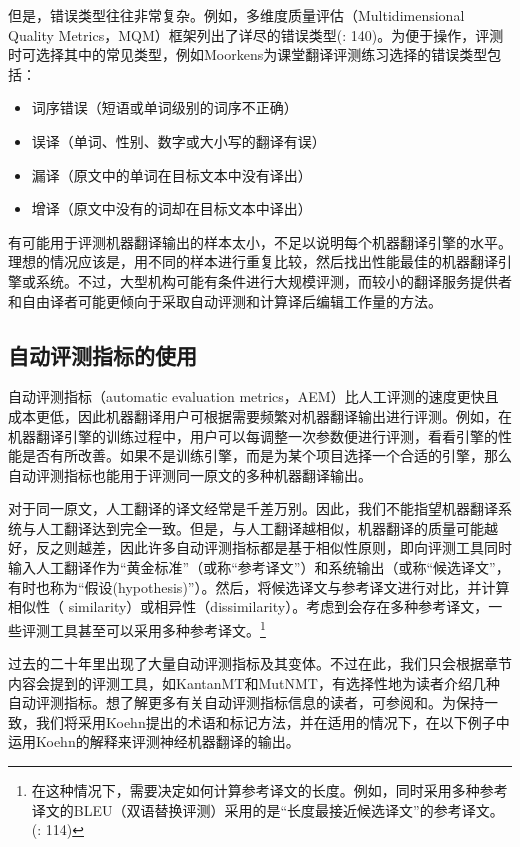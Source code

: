 \documentclass[output=paper]{langscibook}
\begin{document}
但是，错误类型往往非常复杂。例如，多维度质量评估（Multidimensional Quality Metrics，MQM）框架列出了详尽的错误类型(\citealt{MarianaMelby2015}: 140)。为便于操作，评测时可选择其中的常见类型，例如Moorkens为课堂翻译评测练习选择的错误类型\citep[380]{Moorkens2018}包括：

\begin{itemize}
\item 词序错误（短语或单词级别的词序不正确）
\item 误译（单词、性别、数字或大小写的翻译有误）
\item 漏译（原文中的单词在目标文本中没有译出）
\item 增译（原文中没有的词却在目标文本中译出）
\end{itemize}

有可能用于评测机器翻译输出的样本太小，不足以说明每个机器翻译引擎的水平。理想的情况应该是，用不同的样本进行重复比较，然后找出性能最佳的机器翻译引擎或系统。不过，大型机构可能有条件进行大规模评测，而较小的翻译服务提供者和自由译者可能更倾向于采取自动评测和计算译后编辑工作量的方法。


\subsection{自动评测指标的使用}

自动评测指标（automatic evaluation metrics，AEM）比人工评测的速度更快且成本更低，因此机器翻译用户可根据需要频繁对机器翻译输出进行评测。例如，在机器翻译引擎的训练过程中，用户可以每调整一次参数便进行评测，看看引擎的性能是否有所改善。如果不是训练引擎，而是为某个项目选择一个合适的引擎，那么自动评测指标也能用于评测同一原文的多种机器翻译输出。

对于同一原文，人工翻译的译文经常是千差万别。因此，我们不能指望机器翻译系统与人工翻译达到完全一致。但是，与人工翻译越相似，机器翻译的质量可能越好，反之则越差，因此许多自动评测指标都是基于相似性原则，即向评测工具同时输入人工翻译作为“黄金标准”（或称“参考译文”）和系统输出（或称“候选译文”，有时也称为“假设(hypothesis)”）。然后，将候选译文与参考译文进行对比，并计算相似性（ similarity）或相异性（dissimilarity）。考虑到会存在多种参考译文，一些评测工具甚至可以采用多种参考译文。\footnote{在这种情况下，需要决定如何计算参考译文的长度。例如，同时采用多种参考译文的BLEU（双语替换评测）采用的是“长度最接近候选译文”的参考译文。(\citealt{QinSpecia2015}: 114)}

过去的二十年里出现了大量自动评测指标及其变体。不过在此，我们只会根据章节内容会提到的评测工具，如KantanMT和MutNMT，有选择性地为读者介绍几种自动评测指标。想了解更多有关自动评测指标信息的读者，可参阅\citet{Koehn2010}和\citet{Koehn2010}。为保持一致，我们将采用Koehn提出的术语和标记方法，并在适用的情况下，在以下例子中运用Koehn的解释来评测神经机器翻译的输出。
\end{document}
